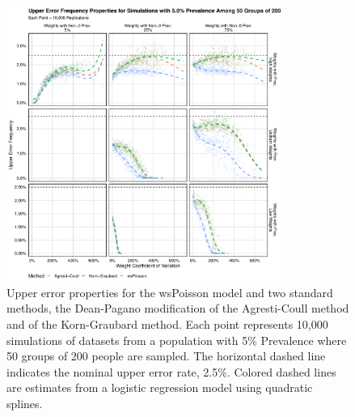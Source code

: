 \documentclass[AMA,STIX1COL]{WileyNJD-v2}
\begin{document}
\begin{figure}
\centering
\includegraphics[width=0.8\textwidth]{figures/perfect_upper_error_frequency_50_groups_0_05_prev.pdf}
\caption{Upper error properties for the wsPoisson model and two standard methods, the Dean-Pagano modification of the Agresti-Coull method and of the Korn-Graubard method.
Each point represents 10,000 simulations of datasets from a population with 5\% Prevalence where 50 groups of 200 people are sampled.
The horizontal dashed line indicates the nominal upper error rate, 2.5\%.
Colored dashed lines are estimates from a logistic regression model using quadratic splines.}
\label{fig:perfect_upper_error_frequency_50_groups_0_05_prev}
\end{figure}
\end{document}
